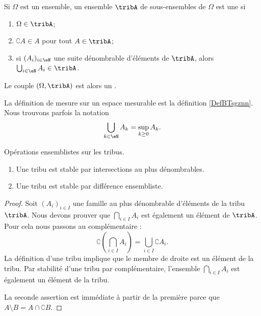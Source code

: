 \begin{definition}  \label{DefjRsGSy} 
    Si \( \Omega\) est un ensemble, un ensemble \( \tribA\) de sous-ensembles de \( \Omega\) est une  si 
    \begin{enumerate}
        \item
            \( \Omega\in\tribA\);
        \item
            \( \complement A\in A\) pour tout \( A\in\tribA\);
        \item
            si \( (A_i)_{i\in \eN}\) une suite dénombrable d'éléments de \( \tribA\), alors \( \bigcup_{i\in \eN}A_i\in\tribA\).
    \end{enumerate}
    Le couple \( (\Omega,\tribA)\) est alors un .
\end{definition}
La définition de mesure sur un espace mesurable est la définition \ref{DefBTsgznn}. Nous trouvons parfois la notation
\begin{equation}
    \bigcup_{k\in \eN}A_k=\sup_{k\geq 0}A_k.
\end{equation}

\begin{lemma}   \label{LemBWNlKfA}
    Opérations ensemblistes sur les tribus.
    \begin{enumerate}
        \item
    Une tribu est stable par intersections au plus dénombrables.
\item
    Une tribu est stable par différence ensembliste.
    \end{enumerate}
\end{lemma}

\begin{proof}
    Soit \( (A_i)_{i\in I}\) une famille au plus dénombrable d'éléments de la tribu \( \tribA\). Nous devons prouver que \( \bigcap_{i\in I}A_i\) est également un élément de \( \tribA\). Pour cela nous passons au complémentaire :
    \begin{equation}
        \complement\left( \bigcap_{i\in I}A_i \right)=\bigcup_{i\in I}\complement A_i.
    \end{equation}
    La définition d'une tribu implique que le membre de droite est un élément de la tribu. Par stabilité d'une tribu par complémentaire, l'ensemble \( \bigcap_{i\in I}A_i\) est également un élément de la tribu.

    La seconde assertion est immédiate à partir de la première parce que \( A\setminus B=A\cap \complement B\).
\end{proof}

